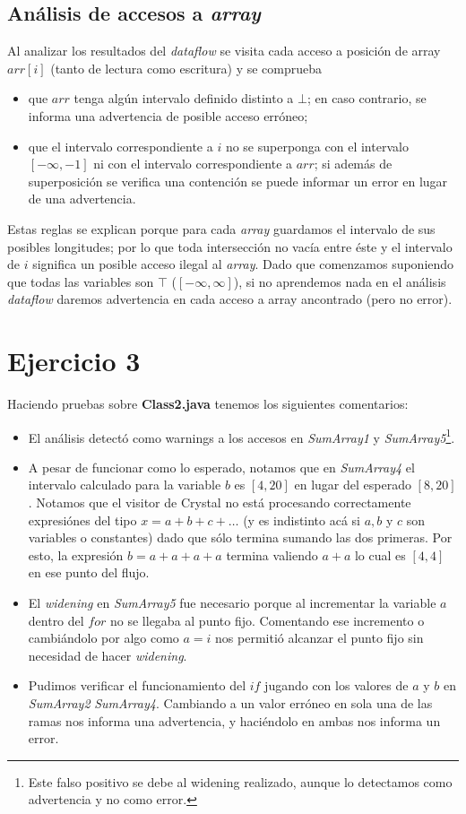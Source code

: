 \documentclass[a4paper]{article}
\begin{document}
\subsection{Análisis de accesos a \emph{array}}

Al analizar los resultados del \emph{dataflow} se visita cada acceso a posición de array $arr[i]$ (tanto de lectura como escritura) y se comprueba 

\begin{itemize}
\item que $arr$ tenga algún intervalo definido distinto a $\bot$; en caso contrario, se informa una advertencia de posible acceso erróneo;
\item que el intervalo correspondiente a $i$ no se superponga con el intervalo $[-\infty,-1]$ ni con el intervalo correspondiente a $arr$; si además de superposición se verifica una contención se puede informar un error en lugar de una advertencia.
\end{itemize}

Estas reglas se explican porque para cada \emph{array} guardamos el intervalo de sus posibles longitudes; por lo que toda intersección no vacía entre éste y el intervalo de $i$ significa un posible acceso ilegal al \emph{array}. Dado que  comenzamos suponiendo que todas las variables son $\top$ ($[-\infty,\infty]$), si no aprendemos nada en el análisis \emph{dataflow} daremos advertencia en cada acceso a array ancontrado (pero no error).

\section{Ejercicio 3}

Haciendo pruebas sobre \textbf{Class2.java} tenemos los siguientes comentarios: 
\begin{itemize}
\item El análisis detectó como warnings a los accesos en \emph{SumArray1} y \emph{SumArray5}\footnote{Este falso positivo se debe al widening realizado, aunque lo detectamos como advertencia y no como error.}.
\item A pesar de funcionar como lo esperado, notamos que en \emph{SumArray4} el intervalo calculado para la variable $b$ es $[4,20]$ en lugar del esperado $[8,20]$. Notamos que el visitor de Crystal no está procesando correctamente expresiónes del tipo $ x = a + b + c + \dots$ (y es indistinto acá si $a,b$ y $c$ son variables o constantes) dado que sólo termina sumando las dos primeras. Por esto, la expresión $b = a + a + a + a$ termina valiendo $a + a$ lo cual es $[4,4]$ en ese punto del flujo.
\item El \emph{widening} en \emph{SumArray5} fue necesario porque al incrementar la variable $a$ dentro del $for$ no se llegaba al punto fijo. Comentando ese incremento o cambiándolo por algo como $a = i$ nos permitió alcanzar el punto fijo sin necesidad de hacer \emph{widening}.
\item Pudimos verificar el funcionamiento del $if$ jugando con los valores de $a$ y $b$ en \emph{SumArray2} \emph{SumArray4}. Cambiando a un valor erróneo en sola una de las ramas nos informa una advertencia, y haciéndolo en ambas nos informa un error.
\end{itemize}
\end{document}
